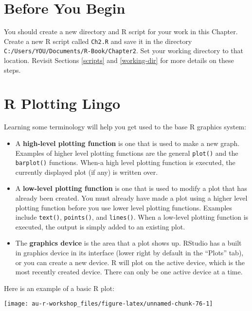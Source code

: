 \documentclass[]{book}
\providecommand{\tightlist}{%
  \setlength{\itemsep}{0pt}\setlength{\parskip}{0pt}}
\theoremstyle{definition}
\theoremstyle{definition}
\theoremstyle{definition}
\theoremstyle{remark}
\begin{document}
\section*{Before You Begin}\label{before-you-begin}

You should create a new directory and R script for your work in this
Chapter. Create a new R script called \texttt{Ch2.R} and save it in the
directory \texttt{C:/Users/YOU/Documents/R-Book/Chapter2}. Set your
working directory to that location. Revisit Sections \ref{scripts} and
\ref{working-dir} for more details on these steps.

\section{R Plotting Lingo}\label{r-plotting-lingo}

Learning some terminology will help you get used to the base R graphics
system:

\begin{itemize}
\tightlist
\item
  A \textbf{high-level plotting function} is one that is used to make a
  new graph. Examples of higher level plotting functions are the general
  \texttt{plot()} and the \texttt{barplot()} functions. When-a high
  level plotting function is executed, the currently displayed plot (if
  any) is written over.
\item
  A \textbf{low-level plotting function} is one that is used to modify a
  plot that has already been created. You must already have made a plot
  using a higher level plotting function before you use lower level
  plotting functions. Examples include \texttt{text()},
  \texttt{points()}, and \texttt{lines()}. When a low-level plotting
  function is executed, the output is simply added to an existing plot.
\item
  The \textbf{graphics device} is the area that a plot shows up. RStudio
  has a built in graphics device in its interface (lower right by
  default in the ``Plots'' tab), or you can create a new device. R will
  plot on the active device, which is the most recently created device.
  There can only be one active device at a time.
\end{itemize}

Here is an example of a basic R plot:

\begin{center}\texttt{[image: au-r-workshop\_files/figure-latex/unnamed-chunk-76-1]} \end{center}
\end{document}
